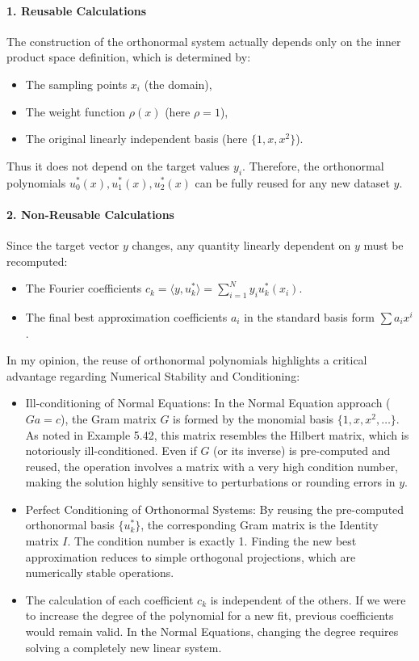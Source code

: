 \documentclass[a4paper]{article}
\begin{document}
\paragraph{1. Reusable Calculations}
The construction of the orthonormal system actually depends only on the inner product space definition, which is determined by:
\begin{itemize}
    \item The sampling points $x_i$ (the domain),
    \item The weight function $\rho(x)$ (here $\rho=1$),
    \item The original linearly independent basis (here $\{1, x, x^2\}$).
\end{itemize}
Thus it does not depend on the target values $y_i$. Therefore, the orthonormal polynomials $u_0^*(x), u_1^*(x), u_2^*(x)$ can be fully reused for any new dataset $y$.

\paragraph{2. Non-Reusable Calculations}
Since the target vector $y$ changes, any quantity linearly dependent on $y$ must be recomputed:
\begin{itemize}
    \item The Fourier coefficients $c_k = \langle y, u_k^* \rangle = \sum_{i=1}^{N} y_i u_k^*(x_i)$.
    \item The final best approximation coefficients $a_i$ in the standard basis form $\sum a_i x^i$.
\end{itemize}
In my opinion, the reuse of orthonormal polynomials highlights a critical advantage regarding Numerical Stability and Conditioning:

\begin{itemize}
    \item {Ill-conditioning of Normal Equations:} In the Normal Equation approach ($G {a} = c$), the Gram matrix $G$ is formed by the monomial basis $\{1, x, x^2, \dots\}$. As noted in Example 5.42, this matrix resembles the Hilbert matrix, which is notoriously ill-conditioned. Even if $G$ (or its inverse) is pre-computed and reused, the operation involves a matrix with a very high condition number, making the solution highly sensitive to perturbations or rounding errors in $y$.
    
    \item Perfect Conditioning of Orthonormal Systems: By reusing the pre-computed orthonormal basis $\{u_k^*\}$, the corresponding Gram matrix is the Identity matrix $I$. The condition number is exactly 1. Finding the new best approximation reduces to simple orthogonal projections, which are numerically stable operations.
    
    \item The calculation of each coefficient $c_k$ is independent of the others. If we were to increase the degree of the polynomial for a new fit, previous coefficients would remain valid. In the Normal Equations, changing the degree requires solving a completely new linear system.
\end{itemize}
\end{document}
